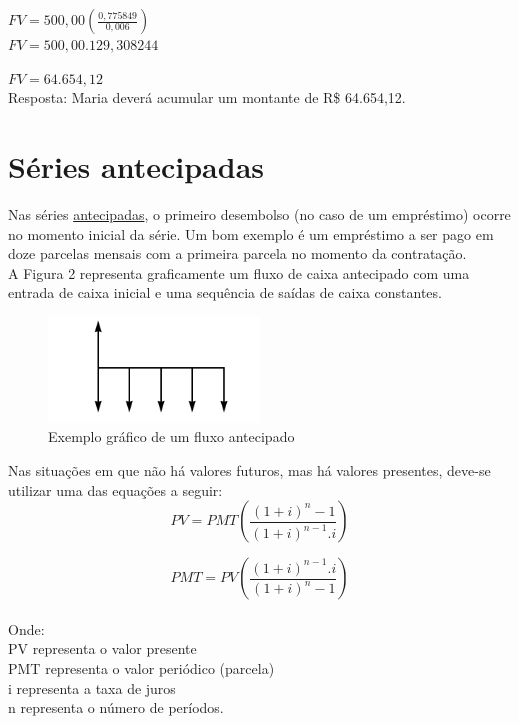 \documentclass[
	article,			%
	11pt,				%
	oneside,			%
	a4paper,			%
	english,			%
	brazil,				%
	sumario=tradicional
	]{abntex2}
\begin{document}
\noindent$ FV = 500,00 \left( \frac{ 0,775849 }{ 0,006 } \right) $\\

\noindent$ FV = 500,00 . 129,308244 $

\noindent$ FV = 64.654,12$\\
Resposta: Maria deverá acumular um montante de R\$ 64.654,12.


\section{Séries antecipadas}

Nas séries \underline{antecipadas}, o primeiro desembolso (no caso de um empréstimo) ocorre no momento inicial da série. Um bom exemplo é um empréstimo a ser pago em doze parcelas mensais com a primeira parcela no momento da contratação.\\
\indent A Figura 2 representa graficamente um fluxo de caixa antecipado com uma entrada de caixa inicial e uma sequência de saídas de caixa constantes.
\begin{figure}
  \begin{center}
    \includegraphics[width=0.5\textwidth]{Fluxoantecipado.jpg}
    \caption{Exemplo gráfico de um fluxo antecipado}
    \label{fig:Fluxoantecipado}
  \end{center}
\end{figure}

Nas situações em que não há valores futuros, mas há valores presentes, deve-se utilizar uma das equações a seguir:\\  
  \begin{equation}
    PV = PMT \left( \frac{ ( 1 + i ) ^{n} - 1 }{ ( 1 + i ) ^{n-1} . i } \right) 
  \end{equation}

  \begin{equation}
    PMT = PV \left( \frac{ ( 1 + i ) ^{n-1} .i }{ ( 1 + i ) ^{n} - 1 } \right) 
  \end{equation}
\\
\tiny Onde: \\   PV representa o valor presente \\ PMT representa o valor periódico (parcela) \\ i representa a taxa de juros \\ n representa o número de períodos.
\end{document}
